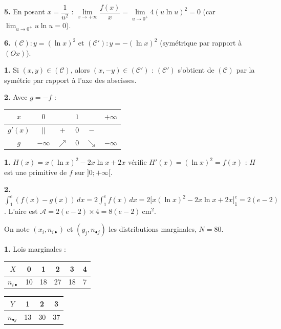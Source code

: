 \documentclass[11pt]{article}
\begin{document}
\textbf{5.} En posant $x = \dfrac{1}{u^2}$ : $\lim\limits_{x\to+\infty}\dfrac{f(x)}{x} = \lim\limits_{u\to 0^+} 4(u\ln u)^2 = 0$ (car $\lim_{u\to 0^+} u\ln u = 0$).

\textbf{6.} $(\mathcal{C}) : y = (\ln x)^2$ et $(\mathcal{C}') : y = -(\ln x)^2$ (symétrique par rapport à $(Ox)$).
\begin{center}
\end{center}

\textbf{1.} Si $(x, y) \in (\mathcal{C})$, alors $(x, -y) \in (\mathcal{C}')$ : $(\mathcal{C}')$ s'obtient de $(\mathcal{C})$ par la symétrie par rapport à l'axe des abscisses.

\textbf{2.} Avec $g = -f$ :
\begin{center}\renewcommand{\arraystretch}{1.4}
\begin{tabular}{|c|ccccc|}
\hline $x$ & $0$ & & $1$ & & $+\infty$ \\\hline $g'(x)$ & $\|$ & $+$ & $0$ & $-$ & \\\hline $g$ & $-\infty$ & $\nearrow$ & $0$ & $\searrow$ & $-\infty$ \\\hline
\end{tabular}
\end{center}

\textbf{1.} $H(x) = x(\ln x)^2 - 2x\ln x + 2x$ vérifie $H'(x) = (\ln x)^2 = f(x)$ : $H$ est une primitive de $f$ sur $]0;+\infty[$.

\textbf{2.} $\displaystyle\int_1^e (f(x) - g(x))\,dx = 2\int_1^e f(x)\,dx = 2\big[x(\ln x)^2 - 2x\ln x + 2x\big]_1^e = 2(e - 2)$. L'aire est $\mathcal{A} = 2(e-2)\times 4 = 8(e - 2)\ \text{cm}^2$.

On note $(x_i, n_{i\bullet})$ et $(y_j, n_{\bullet j})$ les distributions marginales, $N = 80$.

\textbf{1.} Lois marginales :
\begin{center}\renewcommand{\arraystretch}{1.3}
\begin{tabular}{|c|c|c|c|c|c|}\hline $X$ & 0 & 1 & 2 & 3 & 4 \\\hline $n_{i\bullet}$ & 10 & 18 & 27 & 18 & 7 \\\hline\end{tabular}\qquad
\begin{tabular}{|c|c|c|c|}\hline $Y$ & 1 & 2 & 3 \\\hline $n_{\bullet j}$ & 13 & 30 & 37 \\\hline\end{tabular}
\end{center}
\end{document}
